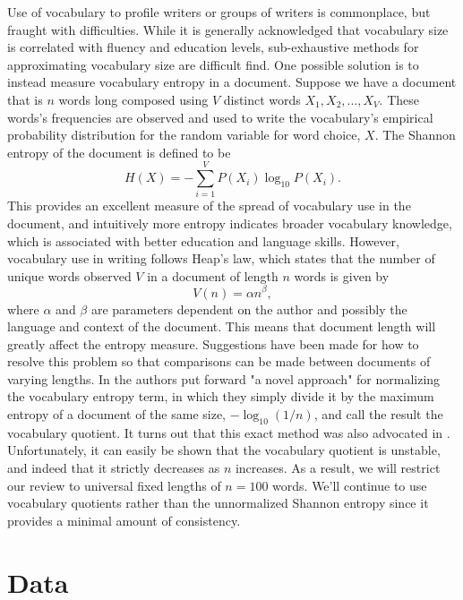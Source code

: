 \documentclass{amsart}
\theoremstyle{definition}
\theoremstyle{plain}
\numberwithin{equation}{section}
\begin{document}
Use of vocabulary to profile writers or groups of writers is commonplace,
but fraught with difficulties. While it is generally acknowledged that
vocabulary size is correlated with fluency and education levels,
sub-exhaustive methods for approximating vocabulary size are difficult find.
One possible solution is to instead measure vocabulary entropy in a
document. Suppose we have a document that is $n$ words long composed using $V
$ distinct words $X_{1},X_{2},...,X_{V}$. These words's frequencies are
observed and used to write the vocabulary's empirical probability
distribution for the random variable for word choice, $X$. The Shannon
entropy of the document is defined to be%
\begin{equation*}
H(X)=-\sum_{i=1}^{V}P(X_{i})\log _{10}P(X_{i}).
\end{equation*}%
This provides an excellent measure of the spread of vocabulary use in the
document, and intuitively more entropy indicates broader vocabulary
knowledge, which is associated with better education and language skills.
However, vocabulary use in writing follows Heap's law, which states that the
number of unique words observed $V$ in a document of length $n$ words is
given by%
\begin{equation*}
V(n)=\alpha n^{\beta },
\end{equation*}%
where $\alpha $ and $\beta $ are parameters dependent on the author and
possibly the language and context of the document. This means that document
length will greatly affect the entropy measure. Suggestions have been made
for how to resolve this problem so that comparisons can be made between
documents of varying lengths. In \cite{rajput2018novel} the authors put
forward "a novel approach" for normalizing the vocabulary entropy term, in
which they simply divide it by the maximum entropy of a document of the same
size, $-\log _{10}\left( 1/n\right) $, and call the result the vocabulary
quotient. It turns out that this exact method was also advocated in \cite[p.
551]{dale2000handbook}. Unfortunately, it can easily be shown that the
vocabulary quotient is unstable, and indeed that it strictly decreases as $n$
increases. As a result, we will restrict our review to universal fixed
lengths of $n=100$ words. We'll continue to use vocabulary quotients rather
than the unnormalized Shannon entropy since it provides a minimal amount of
consistency.

\section{Data}
\end{document}
